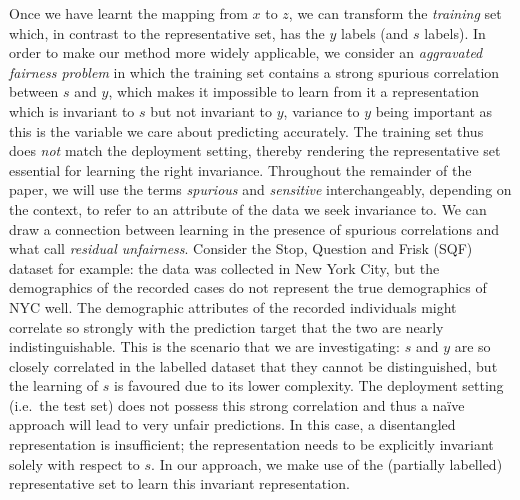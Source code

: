 Once we have learnt the mapping from $x$ to $z$, we can transform the \emph{training} set
which, in contrast to the representative set, has the $y$ labels (and $s$ labels). 
%
In order to make our method more widely applicable, we consider an \emph{aggravated fairness
problem}
in which the training set contains a strong spurious correlation between $s$ and $y$, which makes
it impossible to learn from it a representation which is invariant to $s$ but not invariant to $y$,
variance to $y$ being important as this is the variable we care about predicting accurately. 
%
The training set thus does \emph{not} match the deployment setting, thereby rendering the
representative set essential for learning the right invariance.
Throughout the remainder of the paper, we will use the terms \emph{spurious} and \emph{sensitive}
interchangeably, depending on the context, to refer to an attribute of the data we seek invariance
to.
We can draw a connection between learning in the presence of spurious correlations and what
\citet{kallus2018residual} call \emph{residual unfairness}. 
%
Consider the Stop, Question and Frisk (SQF) dataset for example: the data was collected in New York
City, but the demographics of the recorded cases do not represent the true demographics of NYC
well. 
%
The demographic attributes of the recorded individuals might correlate so strongly with the
prediction target that the two are nearly indistinguishable. 
%
This is the scenario that we are investigating: $s$ and $y$ are so closely correlated in the
labelled dataset that they cannot be distinguished, but the learning of
$s$ is favoured due to its lower complexity.
%
The deployment setting (i.e.\ the test set) does not possess this strong correlation and thus a
na\"ive approach will lead to very unfair predictions. 
%
In this case, a disentangled representation is insufficient; the representation needs to be
explicitly invariant solely with respect to $s$. 
%
In our approach, we make use of the (partially labelled) representative set to learn this invariant
representation.

